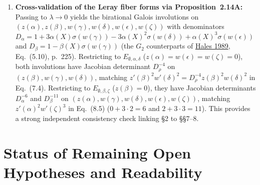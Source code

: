 \documentclass[11pt,letterpaper]{article}
\begin{document}
\begin{enumerate}[(1)]
\item \textbf{Cross-validation of the Leray fiber forms via Proposition~2.14A:} Passing to $\lambda\to 0$ yields the birational Galois involutions on $(z(\alpha),z(\beta),w(\gamma),w(\delta),w(\epsilon),w(\zeta))$ with denominators $D_\alpha = 1+3\alpha(X)\sigma(w(\gamma))-3\alpha(X)^2\sigma(w(\delta))+\alpha(X)^3\sigma(w(\epsilon))$ and $D_\beta = 1-\beta(X)\sigma(w(\gamma))$ (the $G_2$ counterparts of \href{https://www.numdam.org/article/AST_1989__171-172__195_0.pdf}{Hales 1989}, Eq.~(5.10), p.~225). Restricting to $E_{\emptyset,\alpha,\delta}$ ($z(\alpha)=w(\epsilon)=w(\zeta)=0$), both involutions have Jacobian determinant $D_\rho^{-4}$ on $(z(\beta),w(\gamma),w(\delta))$, matching $z'(\beta)^2 w'(\delta)^2 = D_\rho^{-4} z(\beta)^2 w(\delta)^2$ in Eq.~(7.4). Restricting to $E_{\emptyset,\beta,\zeta}$ ($z(\beta)=0$), they have Jacobian determinants $D_\alpha^{-6}$ and $D_\beta^{-11}$ on $(z(\alpha),w(\gamma),w(\delta),w(\epsilon),w(\zeta))$, matching $z'(\alpha)^2 w'(\zeta)^3$ in Eq.~(8.5) ($0+3\cdot 2 = 6$ and $2+3\cdot 3 = 11$). This provides a strong independent consistency check linking \S2 to \S\S7--8.
\end{enumerate}

\section{Status of Remaining Open Hypotheses and Readability}
\end{document}
